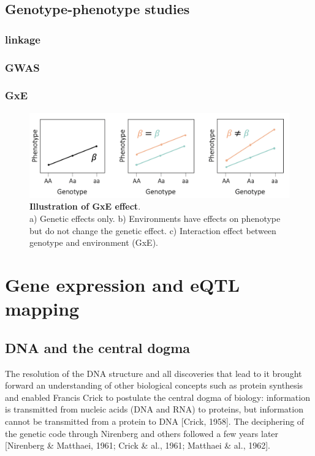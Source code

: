 \subsection{Genotype-phenotype studies}
\subsubsection{linkage}
\subsubsection{GWAS}
\subsubsection{GxE}

\begin{figure}[h]
\centering
\includegraphics[width=15cm]{Chapter1/Fig/GxE.png}
\caption{\textbf{Illustration of GxE effect}.\\
a) Genetic effects only. b) Environments have effects on phenotype but do not change the genetic effect. c) Interaction effect between genotype and environment (GxE).}
\end{figure}

\section{Gene expression and eQTL mapping}  %

\subsection{DNA and the central dogma}
The resolution of the DNA structure and all discoveries that lead to it brought forward an understanding of other biological concepts such as protein synthesis and enabled Francis Crick to postulate the central dogma of biology: information is transmitted from nucleic acids (DNA and RNA) to proteins, but information cannot be transmitted from a protein to DNA [Crick, 1958]. 
The deciphering of the genetic code through Nirenberg and others followed a few years later [Nirenberg \& Matthaei, 1961; Crick \& al., 1961; Matthaei \& al., 1962].\\

